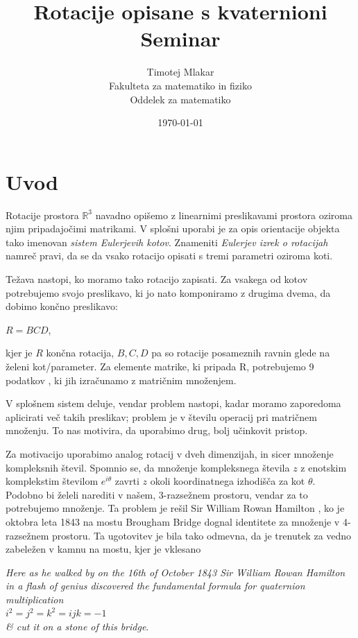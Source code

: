 \documentclass[a4paper,12pt]{article}
\title{Rotacije opisane s kvaternioni \\ 
\Large Seminar}
\author{Timotej Mlakar \\
Fakulteta za matematiko in fiziko \\
Oddelek za matematiko}
\date{\today}
\def\R{\mathbb{R}} %
\begin{document}


\maketitle
\tableofcontents



\section{Uvod}

Rotacije prostora $\R^3$ navadno opišemo z linearnimi preslikavami prostora oziroma njim pripadajočimi matrikami.
V splošni uporabi je za opis orientacije objekta tako imenovan \emph{sistem Eulerjevih kotov}. Znameniti \emph{Eulerjev izrek o rotacijah} namreč pravi,
da se da vsako rotacijo opisati s tremi parametri oziroma koti.

Težava nastopi, ko moramo tako rotacijo zapisati. Za vsakega od kotov potrebujemo svojo preslikavo, ki jo
nato komponiramo z drugima dvema, da dobimo končno preslikavo:
\begin{center}
   $R = BCD$,
\end{center}
kjer je $R$ končna rotacija, $B, C, D$ pa so rotacije posameznih ravnin glede na želeni kot/parameter.
Za elemente matrike, ki pripada R, potrebujemo 9  podatkov \cite{salamin1979application}, ki jih izračunamo z matričnim množenjem.

V splošnem sistem deluje, vendar problem nastopi, kadar moramo zaporedoma aplicirati več takih preslikav; 
problem je v številu operacij pri matričnem množenju. To nas motivira, da uporabimo drug, bolj učinkovit pristop.

Za motivacijo uporabimo analog rotacij v dveh dimenzijah, in sicer množenje kompleksnih števil.
Spomnio se, da množenje kompleksnega števila $z$ z enotskim komplekstim številom $e^{i\theta}$ zavrti $z$ okoli koordinatnega izhodišča za kot $\theta$.
Podobno bi želeli narediti v našem, 3-razsežnem prostoru, vendar za to potrebujemo množenje.
Ta problem je rešil Sir William Rowan Hamilton \cite{shoemake1985animating}, ko je oktobra leta 1843 na mostu Brougham Bridge dognal identitete za množenje v 4-razsežnem prostoru.
Ta ugotovitev je bila tako odmevna, da je trenutek za vedno zabeležen v kamnu na mostu, kjer je vklesano
\begin{center}
   \emph{ Here as he walked by
   on the 16th of October 1843
   Sir William Rowan Hamilton
   in a flash of genius discovered
   the fundamental formula for
   quaternion multiplication}\\
   $i^2 = j^2 = k^2 = ijk = -1$\\
   \emph{ \& cut it on a stone of this bridge}. ~\cite{baez2004baezstuff}
\end{center}
\end{document}

